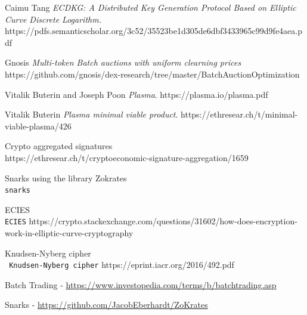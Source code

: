 \documentclass[11pt,parskip=full]{scrartcl}%
\begin{document}
\begin{thebibliography}{9}
Caimu Tang
\textit{ECDKG: A Distributed Key Generation Protocol Based on Elliptic
Curve Discrete Logarithm.}  
https://pdfs.semanticscholar.org/3c52/35523be1d305de6dbf3433965c99d9fe4aea.pdf
 

Gnosis
\textit{Multi-token Batch auctions with uniform clearning prices}  
https://github.com/gnosis/dex-research/tree/master/BatchAuctionOptimization

Vitalik Buterin and Joseph Poon
\textit{Plasma}.
https://plasma.io/plasma.pdf

Vitalik Buterin
\textit{Plasma minimal viable product}.
https://ethresear.ch/t/minimal-viable-plasma/426
 
Crypto aggregated signatures
\\\texttt{}
https://ethresear.ch/t/cryptoeconomic-signature-aggregation/1659

Snarks using the library Zokrates
\\\texttt{snarks}

ECIES
\\\texttt{ECIES}
https://crypto.stackexchange.com/questions/31602/how-does-encryption-work-in-elliptic-curve-cryptography

Knudsen-Nyberg cipher
\\\texttt{ Knudsen-Nyberg cipher}
https://eprint.iacr.org/2016/492.pdf


Batch Trading - \href{https://www.investopedia.com/terms/b/batchtrading.asp}{https://www.investopedia.com/terms/b/batchtrading.asp}

 Snarks - \href{https://github.com/JacobEberhardt/ZoKrates}{https://github.com/JacobEberhardt/ZoKrates}

\end{thebibliography}
\end{document}
